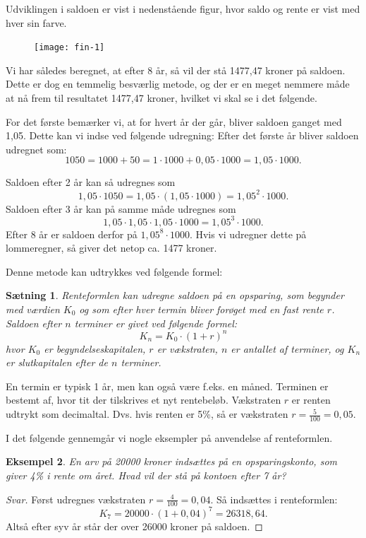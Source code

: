 \documentclass[12pt,oneside,a4paper]{article}
\newtheorem{thm}{Sætning}[section]
\newtheorem{eks}[thm]{Eksempel}
\begin{document}
Udviklingen i saldoen er vist i nedenstående figur, hvor saldo og rente er vist med hver sin farve.
\begin{figure}[H]
    \centering
    \texttt{[image: fin-1]}
\end{figure}

Vi har således beregnet, at efter 8 år, så vil der stå 1477,47 kroner på saldoen.  Dette
er dog en temmelig besværlig metode, og der er en meget nemmere måde at nå frem
til resultatet 1477,47 kroner, hvilket vi skal se i det følgende.

For det første bemærker vi, at for hvert år der går, bliver saldoen ganget med
1,05. Dette kan vi indse ved følgende udregning: Efter det første år bliver
saldoen udregnet som:
\[
1050 = 1000 + 50 = 1\cdot 1000 + 0,05\cdot 1000 = 1,05 \cdot 1000.
\]

Saldoen efter 2 år kan så udregnes som
\[
1,05\cdot 1050 = 1,05 \cdot (1,05 \cdot 1000) = 1,05^2 \cdot 1000.
\]
Saldoen efter 3 år kan på samme måde udregnes som
\[
1,05\cdot1,05\cdot1,05\cdot 1000 = 1,05^3 \cdot 1000.
\]
Efter 8 år er saldoen
derfor på $1,05^8\cdot 1000$. Hvis vi udregner dette på lommeregner, så giver
det netop ca. 1477 kroner.

Denne metode kan udtrykkes ved følgende formel:
\begin{tcolorbox}
\begin{thm}
    {\em Renteformlen} kan udregne saldoen på en opsparing, som begynder med
    værdien $K_0$ og som efter hver {\em termin} bliver forøget med en fast
    rente $r$. Saldoen efter $n$ terminer er givet ved følgende formel:
    $$
    K_n = K_0 \cdot (1+r)^n
    $$
    hvor $K_0$ er {\em begyndelseskapitalen}, $r$ er {\em vækstraten}, $n$ er antallet af
    terminer, og $K_n$ er {\em slutkapitalen} efter de $n$ terminer.
\end{thm}
\end{tcolorbox}
En termin er typisk 1 år, men kan også være f.eks. en måned. Terminen er bestemt af,
hvor tit der tilskrives et nyt rentebeløb. Vækstraten $r$ er renten udtrykt som
decimaltal. Dvs. hvis renten er 5\%, så er vækstraten $r=\frac{5}{100}=0,05$.

I det følgende gennemgår vi nogle eksempler på anvendelse af renteformlen.
\begin{tcolorbox}
\begin{eks}
    En arv på 20000 kroner indsættes på en opsparingskonto, som
    giver 4\% i rente om året. Hvad vil der stå på kontoen efter 7 år?
\end{eks}
\begin{proof}[Svar]
    Først udregnes vækstraten $r=\frac{4}{100} = 0,04$. Så indsættes i renteformlen:
    $$
    K_7 = 20000 \cdot (1 + 0,04)^7 = 26318,64.
    $$
    Altså efter syv år står der over 26000 kroner på saldoen.
\end{proof}
\end{tcolorbox}
\end{document}
